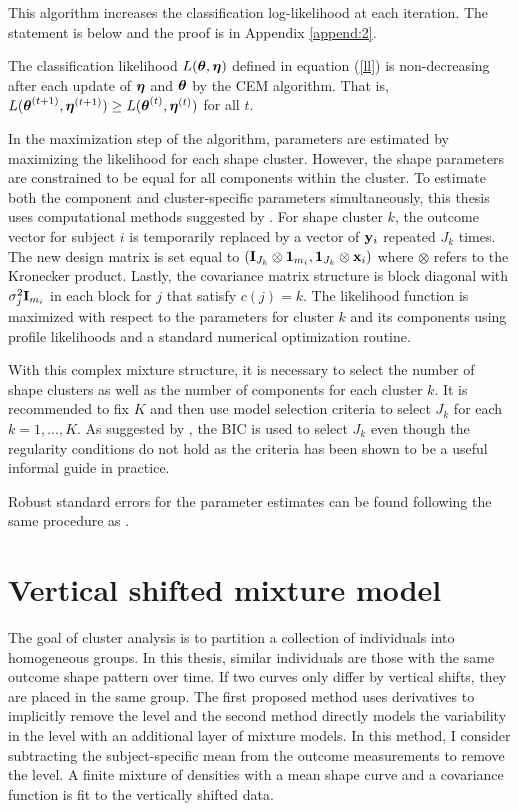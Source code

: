 This algorithm increases the classification log-likelihood at each iteration. The statement is below and the proof is in Appendix \ref{append:2}. 
\begin{theorem}\label{Thm:CEM} The classification likelihood $L(\boldsymbol\theta,\boldsymbol\eta)$ defined in equation (\ref{ll}) is non-decreasing after each update of $\boldsymbol\eta$ and $\boldsymbol\theta$ by the CEM algorithm. That is, $L(\boldsymbol\theta^{(t+1)},\boldsymbol\eta^{(t+1)}) \geq L(\boldsymbol\theta^{(t)},\boldsymbol\eta^{(t)})$ for all $t$.
\end{theorem}

In the maximization step of the algorithm, parameters are estimated by maximizing the likelihood for each shape cluster. However, the shape parameters are constrained to be equal for all components within the cluster. To estimate both the component and cluster-specific parameters simultaneously, this thesis uses computational methods suggested by \textcite{grun2008}. For shape cluster $k$, the outcome vector for subject $i$ is temporarily replaced by a vector of $\mathbf y_{i}$ repeated $J_{k}$ times. The new design matrix  is set equal to $(\mathbf I_{J_{k}}\otimes \boldsymbol 1_{m_{i}}, \boldsymbol 1_{J_{k}} \otimes \mathbf x_{i})$ where $\otimes$ refers to the Kronecker product. Lastly, the covariance matrix structure is block diagonal with $\sigma^{2}_{j}\mathbf I_{m_{i}}$ in each block for $j$ that satisfy $c(j)=k$. The likelihood function is maximized with respect to the parameters for cluster $k$ and its components using profile likelihoods and a standard numerical optimization routine.

With this complex mixture structure, it is necessary to select the number of shape clusters as well as the number of components for each cluster $k$. It is recommended to fix $K$ and then use model selection criteria to select $J_{k}$ for each $k=1,...,K$. As suggested by \textcite{li2005}, the BIC is used to select $J_{k}$ even though the regularity conditions do not hold as the criteria has been shown to be a useful informal guide in practice.

Robust standard errors for the parameter estimates can be found following the same procedure as \textcite{boldea2009}.

\section{Vertical shifted mixture model}
The goal of cluster analysis is to partition a collection of individuals into homogeneous groups. In this thesis, similar individuals are those with the same outcome shape pattern over time. If two curves only differ by vertical shifts, they are placed in the same group. The first proposed method uses derivatives to implicitly remove the level and the second method directly models the variability in the level with an additional layer of mixture models.  In this method, I consider subtracting the subject-specific mean from the outcome measurements to remove the level. A finite mixture of densities with a mean shape curve and a covariance function is fit to the vertically shifted data. 

